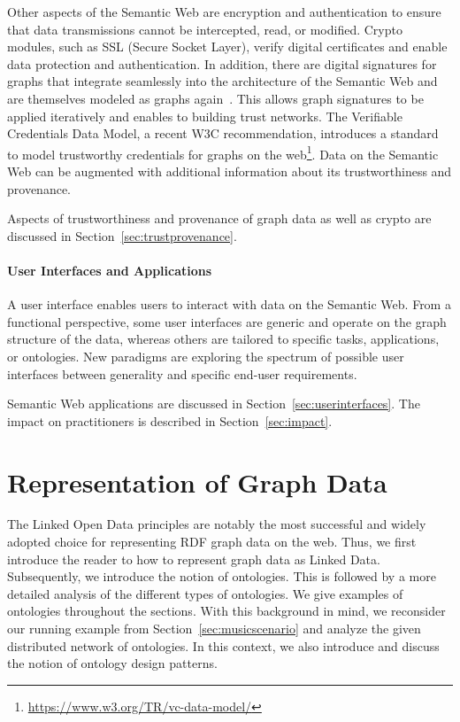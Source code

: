 \documentclass[a4paper,USenglish]{tgdk-v2021}
\newcommand{\myurl}[1]{\footnote{\url{#1}}}
\begin{document}
Other aspects of the Semantic Web are encryption and authentication to ensure that data transmissions cannot be intercepted, read, or modified.
Crypto modules, such as SSL (Secure Socket Layer), verify digital certificates and enable data protection and authentication.
In addition, there are digital signatures for graphs that integrate seamlessly into the architecture of the Semantic Web and are themselves modeled as graphs again~\cite{DBLP:conf/esws/KastenSS14}.
This allows graph signatures to be applied iteratively and enables to building trust networks.
The Verifiable Credentials Data Model, a recent W3C recommendation, introduces a standard to model trustworthy credentials for graphs on the web\myurl{https://www.w3.org/TR/vc-data-model/}.
Data on the Semantic Web can be augmented with additional information about its trustworthiness and provenance.

Aspects of trustworthiness and provenance of graph data as well as crypto are discussed in Section~\ref{sec:trustprovenance}.

\paragraph*{User Interfaces and Applications}
A user interface enables users to interact with data on the Semantic Web.
From a functional perspective, some user interfaces are generic and operate on the graph structure of the data, whereas others are tailored to specific tasks, applications, or ontologies. 
New paradigms are exploring the spectrum of possible user interfaces between generality and specific end-user requirements.

Semantic Web applications are discussed in Section~\ref{sec:userinterfaces}.
The impact on practitioners is described in Section~\ref{sec:impact}.

\section{Representation of Graph Data}
\label{sec:representation} 

The Linked Open Data principles are notably the most successful and widely adopted choice for representing RDF graph data on the web.
Thus, we first introduce the reader to how to represent graph data as Linked Data.
Subsequently, we introduce the notion of ontologies. 
This is followed by a more detailed analysis of the different types of ontologies.
We give examples of ontologies throughout the sections.
With this background in mind, we reconsider our running example from Section~\ref{sec:musicscenario} and analyze the given distributed network of ontologies. 
In this context, we also introduce and discuss the notion of ontology design patterns.
\end{document}
